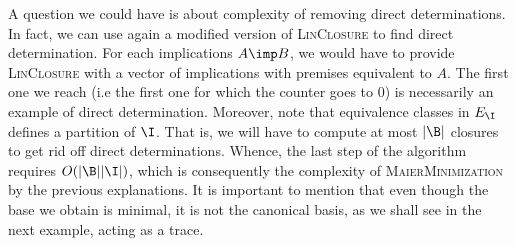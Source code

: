A question we could have is about complexity of removing direct determinations.
In fact, we can use again a modified version of \textsc{LinClosure} to find
direct determination. For each implications $A \imp B$, we would have to 
provide \textsc{LinClosure} with a vector of implications with premises 
equivalent to $A$. The first one we reach (i.e the first one for which the 
counter goes to 0) is necessarily an example of direct determination. Moreover,
note that equivalence classes in $E_{\I}$ defines a partition of $\I$. That is,
we will have to compute at most $|\B|$ closures to get rid off direct 
determinations. Whence, the last step of the algorithm requires $O(|\B||\I|)$,
which is consequently the complexity of \textsc{MaierMinimization} by the 
previous explanations. It is important to mention that even though the base
we obtain is minimal, it is not the canonical basis, as we shall see in the
next example, acting as a trace.

\vspace{1.2em}

